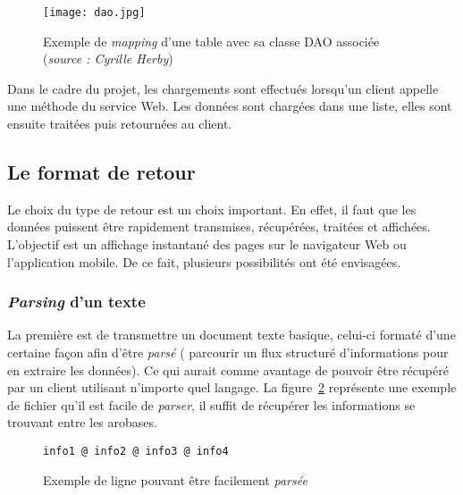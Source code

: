\begin{figure}[!ht]
	\centering
	\texttt{[image: dao.jpg]}
	\caption{Exemple de \textit{mapping} d'une table avec sa classe DAO associ\'ee (\textit{source : Cyrille Herby})}
	\label{figure:dao}

\end{figure}

Dans le cadre du projet, les chargements sont effectu\'es lorsqu'un client appelle une m\'ethode du service Web. 
Les donn\'ees sont charg\'ees dans une liste, elles sont ensuite trait\'ees puis retourn\'ees au client.

\subsection{Le format de retour}
\label{section:formatRetour}

Le choix du type de retour est un choix important.
En effet, il faut que les donn\'ees puissent \^etre rapidement transmises, r\'ecup\'er\'ees, trait\'ees et affich\'ees.
L'objectif est un affichage instantan\'e des pages sur le navigateur Web ou l'application mobile.
De ce fait, plusieurs possibilit\'es ont \'et\'e envisag\'ees.

\subsubsection{{\og}\textit{Parsing}{\fg} d'un texte}

La premi\`ere est de transmettre un document texte basique, celui-ci format\'e d'une certaine fa\c{c}on afin d'\^etre \textit{pars\'e} ({\cad} parcourir un flux structur\'e d'informations pour en extraire les donn\'ees).
Ce qui aurait comme avantage de pouvoir \^etre r\'ecup\'er\'e par un client utilisant n'importe quel langage.
La figure~\ref{code:exemplePlaintext} repr\'esente une exemple de fichier qu'il est facile de \textit{parser}, il suffit de r\'ecup\'erer les informations se trouvant entre les arobases.

\vspace{0.20cm}

\begin{figure}[!ht]
	\begin{lstlisting}[language=plaintext]
	info1 @ info2 @ info3 @ info4
	\end{lstlisting}
	
	\caption{Exemple de ligne pouvant \^etre facilement \textit{pars\'ee}}
	\label{code:exemplePlaintext}

\end{figure}

